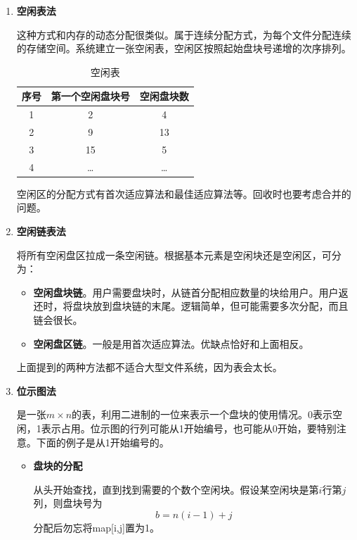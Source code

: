\documentclass[12pt, a4paper, oneside]{ctexart}
\begin{document}
\begin{enumerate}
  \item {\bf 空闲表法}
  
  这种方式和内存的动态分配很类似。属于连续分配方式，为每个文件分配连续的存储空间。系统建立一张空闲表，空闲区按照起始盘块号递增的次序排列。

  \begin{table}[!ht]
    \centering
    \caption{空闲表}
    \label{idle-table}
    \begin{tabular}{c|c|c}
    \hline
      \textbf{序号} & \textbf{第一个空闲盘块号} & \textbf{空闲盘块数} \\ \hline
      1 & 2 & 4 \\ \hline
      2 & 9 & 13 \\ \hline
      3 & 15 & 5 \\ \hline
      4 & \dots & \dots \\ \hline
    \end{tabular}
  \end{table}

  空闲区的分配方式有首次适应算法和最佳适应算法等。回收时也要考虑合并的问题。

  \item {\bf 空闲链表法}
  
  将所有空闲盘区拉成一条空闲链。根据基本元素是空闲块还是空闲区，可分为：
  \begin{itemize}
    \item {\bf 空闲盘块链}。用户需要盘块时，从链首分配相应数量的块给用户。用户返还时，将盘块放到盘块链的末尾。逻辑简单，但可能需要多次分配，而且链会很长。
    \item {\bf 空闲盘区链}。一般是用首次适应算法。优缺点恰好和上面相反。
  \end{itemize}

  \vspace*{10pt}

  上面提到的两种方法都不适合大型文件系统，因为表会太长。

  \item {\bf 位示图法}
  
  是一张$m\times n$的表，利用二进制的一位来表示一个盘块的使用情况。0表示空闲，1表示占用。位示图的行列可能从1开始编号，也可能从0开始，要特别注意。下面的例子是从1开始编号的。

  \begin{itemize}
    \item {\bf 盘块的分配}
    
    从头开始查找，直到找到需要的个数个空闲块。假设某空闲块是第$i$行第$j$列，则盘块号为
    \begin{equation*}
      b=n(i-1)+j
    \end{equation*}
    分配后勿忘将map[i,j]置为1。


\end{itemize}
\end{enumerate}
\end{document}
